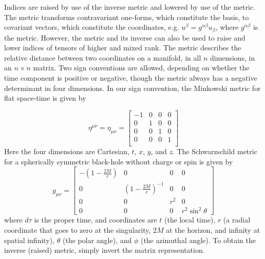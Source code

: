Indices are raised by use of the inverse metric and lowered by use of the metric. The metric transforms contravariant one-forms, which constitute the basis, to covariant vectors, which constitute the coordinates, e.g. $u^\beta=g^{\alpha\beta}u_\beta$, where $g^{\alpha\beta}$ is the metric. However, the metric and its inverse can also be used to raise and lower indices of tensors of higher and mixed rank. The metric describes the relative distance between two coordinates on a manifold, in all $n$ dimensions, in an $n\times n$ matrix. Two sign conventions are allowed, depending on whether the time component is positive or negative, though the metric always has a negative determinant in four dimensions. In our sign convention, the Minkowski metric for flat space-time is given by


\[
\eta^{\mu\nu}=\eta_{\mu\nu}=
\begin{bmatrix}
  -1 & 0 & 0 & 0\\
  0 & 1 & 0 & 0\\
  0 & 0 & 1 & 0\\
  0 & 0 & 0 & 1\\
\end{bmatrix}
\]
Here the four dimensions are Cartesian, $t$, $x$, $y$, and $z$. The Schwarzschild metric for a spherically symmetric black-hole without charge or spin is given by
\[
g_{\mu\nu}=
\begin{bmatrix}
  -(1-\frac{2M}{r}) & 0 & 0 & 0\\
  0 & (1-\frac{2M}{r})^{-1} & 0 &0\\
  0 & 0 & r^2 & 0\\
  0 & 0 & 0 & r^2\sin^2\theta
\end{bmatrix}
\]
where $d\tau$ is the proper time, and coordinates are $t$ (the local time), $r$ (a radial coordinate that goes to zero at the singularity, $2M$ at the horizon, and infinity at spatial infinity), $\theta$ (the polar angle), and $\phi$ (the azimuthal angle). To obtain the inverse (raised) metric, simply invert the matrix representation.


